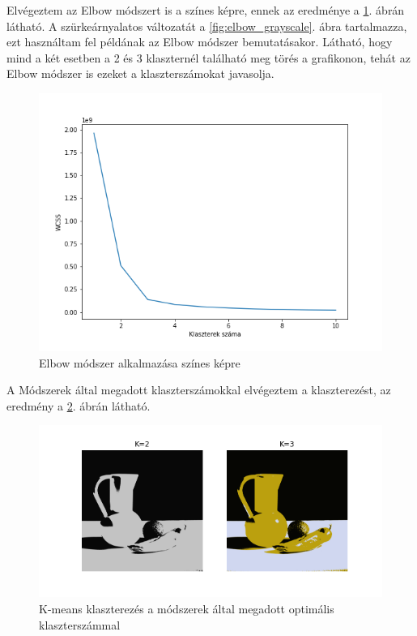 Elvégeztem az Elbow módszert is a színes képre, ennek az eredménye a \ref{fig:elbow_rgb}. ábrán látható. A szürkeárnyalatos változatát a \ref{fig:elbow_grayscale}. ábra tartalmazza, ezt használtam fel példának az Elbow módszer bemutatásakor. Látható, hogy mind a két esetben a 2 és 3 klaszternél található meg törés a grafikonon, tehát az Elbow módszer is ezeket a klaszterszámokat javasolja.

\begin{figure}[h]
\centering
\includegraphics[scale=0.7]{images/elbow_rgb.png}
\caption{Elbow módszer alkalmazása színes képre}
\label{fig:elbow_rgb}
\end{figure}

A Módszerek által megadott klaszterszámokkal elvégeztem a klaszterezést, az eredmény a \ref{fig:kmeans_optimal_pictures}. ábrán látható.

\begin{figure}[h]
\centering
\includegraphics[scale=0.7]{images/kmeans_optimal_pictures.png}
\caption{K-means klaszterezés a módszerek által megadott optimális klaszterszámmal}
\label{fig:kmeans_optimal_pictures}
\end{figure}

